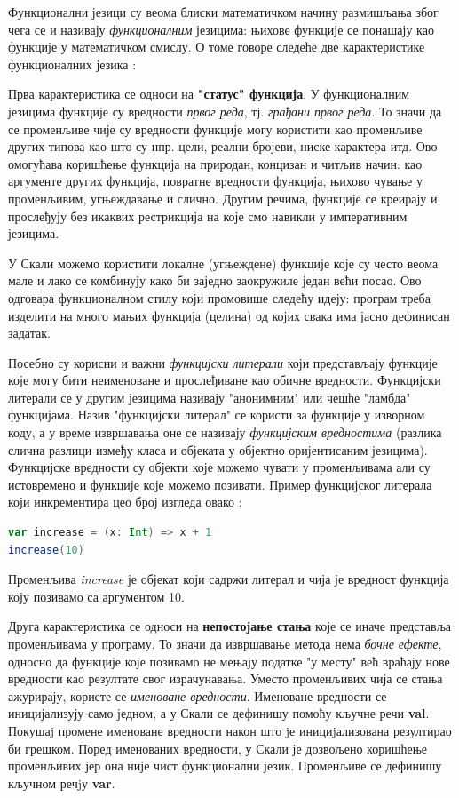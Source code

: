 \documentclass[12pt,oneside]{memoir}
\begin{document}
\par Функционални језици су веома блиски математичком начину размишљања због чега се и називају \textit{функционалним} језицима: њихове функције се понашају као функције у математичком смислу. О томе говоре следеће две карактеристике функционалних језика \cite{progInScala}: 
\par Прва карактеристика се односи на \textbf{"статус" функција}. У функционалним језицима функције су вредности \textit{првог реда}, тј. \textit{грађани првог реда}. То значи да се променљиве чије су вредности функције могу користити као променљиве других типова као што су нпр. цели, реални бројеви, ниске карактера итд. Ово омогућава коришћење функција на природан, концизан и читљив начин: као аргументе других функција, повратне вредности функција, њихово чување у променљивим, угњеждавање и слично. Другим речима, функције се креирају и прослеђују без икаквих рестрикција на које смо навикли у императивним језицима.
\par У Скали можемо користити локалне (угњеждене) функције које су често веома мале и лако се комбинују како би заједно заокружиле један већи посао. Ово одговара функционалном стилу који промовише следећу идеју: програм треба изделити на много мањих функција (целина) од којих свака има јасно дефинисан задатак.
\par Посебно су корисни и важни \textit{функцијски литерали} који представљају функције које могу бити неименоване и прослеђиване као обичне вредности. Функцијски литерали се у другим језицима називају "анонимним" или чешће "ламбда" функцијама. Назив "функцијски литерал" се користи за функције у изворном коду, а у време извршавања оне се називају \textit{функцијским вредностима} (разлика слична разлици између класа и објеката у објектно оријентисаним језицима). Функцијске вредности су објекти које можемо чувати у променљивама али су истовремено и функције које можемо позивати. Пример функцијског литерала који инкрементира цео број изгледа овако \cite{progInScala}:
\begin{lstlisting}[language=Scala]
var increase = (x: Int) => x + 1
increase(10)
\end{lstlisting}
Променљива \textit{increase} је објекат који садржи литерал и чија је вредност функција коју позивамо са аргументом 10.
\par Друга карактеристика се односи на \textbf{непостојање стања} које се иначе представља променљивама у програму. То значи да извршавање метода нема \textit{бочне ефекте}, односно да функције које позивамо не мењају податке "у месту" већ враћају нове вредности као резултате свог израчунавања. Уместо променљивих чија се стања ажурирају, користе се \textit{именоване вредности}. Именоване вредности се иницијализују само једном, а у Скали се дефинишу помоћу кључне речи \textbf{val}. Покушаj промене именоване вредности након што jе инициjализована резултирао би грешком. Поред именованих вредности, у Скали је дозвољено коришћење променљивих јер она није чист функционални језик. Променљиве се дефинишу кључном речjу \textbf{var}.
\end{document}
